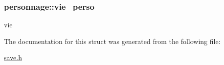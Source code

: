 \subsubsection[{\texorpdfstring{vie\+\_\+perso}{vie_perso}}]{ personnage\+::vie\+\_\+perso}\hypertarget{structpersonnage_ac96f4aee44111bc31a7718e5762bf483}{}\label{structpersonnage_ac96f4aee44111bc31a7718e5762bf483}
vie 

The documentation for this struct was generated from the following file\+:\begin{DoxyCompactItemize}
\item 
\hyperlink{save_8h}{save.\+h}\end{DoxyCompactItemize}
